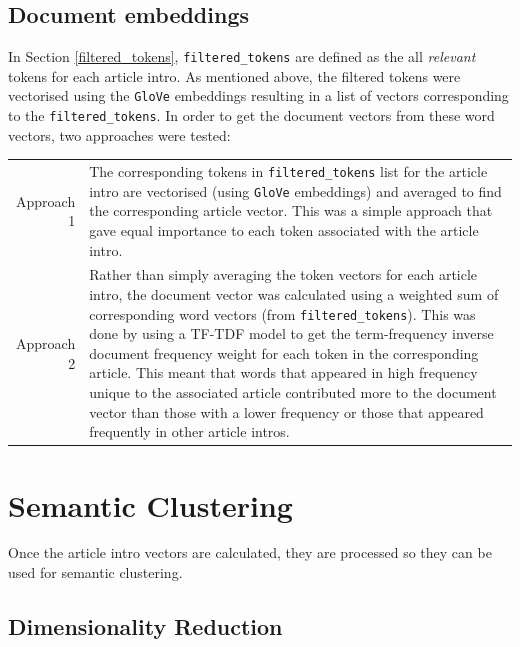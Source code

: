 \subsection{Document embeddings}

In Section \ref{filtered_tokens}, \texttt{filtered\_tokens} are defined as the all \textit{relevant} tokens for each article intro. As mentioned above, the filtered tokens were vectorised using the \texttt{GloVe} embeddings \cite{glove} resulting in a list of vectors corresponding to the \texttt{filtered\_tokens}. In order to get the document vectors from these word vectors, two approaches were tested: 

\renewcommand\arraystretch{2}
\captionsetup{singlelinecheck=false, labelfont=sc, labelsep=quad}
\begin{longtable}{@{\,}r <{\hskip 2pt} !{\foo} >{\arraybackslash}p{13cm}}
\centering

Approach 1 & The corresponding tokens in \texttt{filtered\_tokens} list for the article intro are vectorised (using \texttt{GloVe} embeddings) and averaged to find the corresponding article vector. This was a simple approach that gave equal importance to each token associated with the article intro. \\

Approach 2 & Rather than simply averaging the token vectors for each article intro, the document vector was calculated using a weighted sum of corresponding word vectors (from \texttt{filtered\_tokens}). This was done by using a TF-TDF model to get the term-frequency inverse document frequency weight for each token in the corresponding article. This meant that words that appeared in high frequency unique to the associated article contributed more to the document vector than those with a lower frequency or those that appeared frequently in other article intros. \\
\end{longtable}


\section{Semantic Clustering}

Once the article intro vectors are calculated, they are processed so they can be used for semantic clustering. 

\subsection{Dimensionality Reduction}

